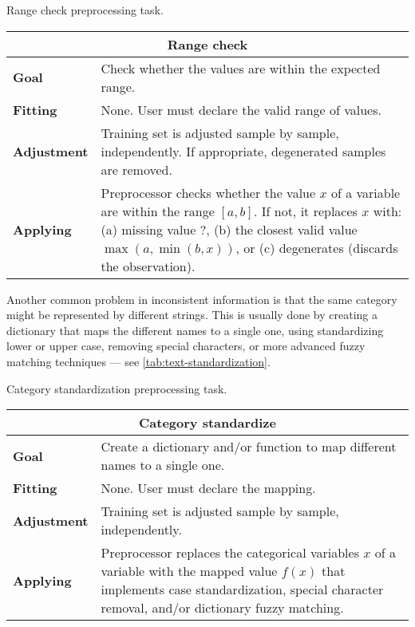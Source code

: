 \begin{tablebox}[label=tab:range-check]{Range check preprocessing task.}
  \centering
  \begin{tabular}{lp{6cm}}
    \toprule
    \multicolumn{2}{c}{\textbf{Range check}} \\
    \midrule
    \textbf{Goal} &
      Check whether the values are within the expected range. \\
    \textbf{Fitting} &
      None. User must declare the valid range of values. \\
    \textbf{Adjustment} &
      Training set is adjusted sample by sample, independently.  If appropriate,
      degenerated samples are removed. \\
    \textbf{Applying} &
      Preprocessor checks whether the value $x$ of a variable are within the range $[a,
      b]$.  If not, it replaces $x$ with: (a) missing value $?$, (b) the closest valid
      value $\max(a, \min(b, x))$, or (c) degenerates (discards the observation). \\
    \bottomrule
  \end{tabular}
\end{tablebox}

Another common problem in inconsistent information is that the same category might be
represented by different strings.  This is usually done by creating a dictionary that maps
the different names to a single one, using standardizing lower or upper case, removing
special characters, or more advanced fuzzy matching techniques --- see
\cref{tab:text-standardization}.

\begin{tablebox}[label=tab:text-standardization]{Category standardization preprocessing task.}
  \centering
  \begin{tabular}{lp{6cm}}
    \toprule
    \multicolumn{2}{c}{\textbf{Category standardize}} \\
    \midrule
    \textbf{Goal} &
      Create a dictionary and/or function to map different names to a single one. \\
    \textbf{Fitting} &
      None. User must declare the mapping. \\
    \textbf{Adjustment} &
      Training set is adjusted sample by sample, independently. \\
    \textbf{Applying} &
      Preprocessor replaces the categorical variables $x$ of a variable with the mapped
      value $f(x)$ that implements case standardization, special character removal, and/or
      dictionary fuzzy matching. \\
    \bottomrule
  \end{tabular}
\end{tablebox}

